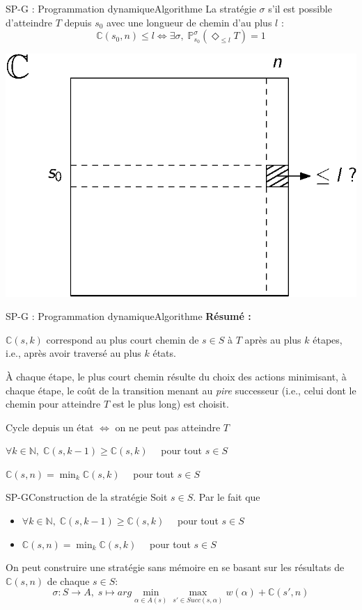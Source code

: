 \documentclass[compress]{beamer}
\theoremstyle{theorem}%
\begin{document}
\begin{frame}{SP-G : Programmation dynamique}{Algorithme}
La stratégie $\sigma$ s'il est possible d'atteindre $T$ depuis $s_0$ avec une longueur
de chemin d'au plus $l$ :
\[
  \mathbb{C}(s_0, n) \leq l \iff \exists \sigma, \; \mathbb{P}_{s_0}^\sigma(\Diamond_{\leq l} T) = 1
\]
\begin{center}
  \includegraphics[width=0.4\linewidth]{resources/sp-g2}
\end{center}
\end{frame}

\begin{frame}{SP-G : Programmation dynamique}{Algorithme}
  \textbf{\color{fibeamer@orange}Résumé :}
  \begin{itemize}
    \item $\mathbb{C}(s, k)$ correspond au plus court chemin de $s \in S$ à $T$ après \alert{au plus} $k$ étapes, i.e., après avoir traversé \alert{au plus} $k$ états.
    \item \`A chaque étape, le plus court chemin résulte du choix des actions minimisant, à chaque étape, le coût de la transition menant au \textit{pire} successeur (i.e., celui dont le chemin pour atteindre $T$ est le plus long) est choisit.
    \item Cycle depuis un état $\iff$ on ne peut pas atteindre $T$
    { \color{fibeamer@blue}
    \item $\forall k \in \mathbb{N}, \; \mathbb{C}(s, k-1) \geq \mathbb{C}(s, k)\quad$ pour tout $s \in S$
    \item $\mathbb{C}(s, n) = \min_k \mathbb{C}(s, k)\quad$ pour tout $s \in S$
    }
  \end{itemize}
\end{frame}

\begin{frame}{SP-G}{Construction de la stratégie}
Soit $s \in S$. Par le fait que
\begin{itemize}
    \item $\forall k \in \mathbb{N}, \; \mathbb{C}(s, k-1) \geq \mathbb{C}(s, k)\quad$ pour tout $s \in S$
    \item $\mathbb{C}(s, n) = \min_k \mathbb{C}(s, k)\quad$ pour tout $s \in S$
\end{itemize}
On peut construire une stratégie sans mémoire en se basant sur les résultats de $\mathbb{C}(s, n)$ de chaque $s \in S$:
\[
  \sigma : S \rightarrow A, \; s \mapsto arg \min_{\alpha \in A(s)} \max_{s' \in Succ(s, \alpha)} w(\alpha) + \mathbb{C}(s', n)
\]
\end{frame}
\end{document}
